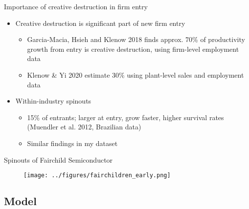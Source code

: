 \documentclass[english,usenames,dvipsnames,handout]{beamer}
\begin{document}
\begin{frame}{Importance of creative destruction in firm entry}\label{motivation:importance_of_creative_destruction}
	\hyperlink{motivation_spillovers}{}
	\begin{itemize}
		\item Creative destruction is significant part of new firm entry
		\begin{itemize}
			\item Garcia-Macia, Hsieh and Klenow 2018 finds approx. 70\% of productivity growth from entry is creative destruction, using firm-level employment data
			\item Klenow \& Yi 2020 estimate 30\% using plant-level sales and employment data
		\end{itemize}
	\end{itemize}
\end{frame}



\begin{frame}\label{spinouts_facts_from_literature}
\hyperlink{motivation_spillovers}{}
	\begin{itemize}
	\item Within-industry spinouts
		\begin{itemize}
		\item 15\% of entrants; larger at entry, grow faster, higher survival rates (Muendler et al. 2012, Brazilian data)
		\item Similar findings in my dataset
		\end{itemize}
	\end{itemize}
\end{frame}



\begin{frame}{Spinouts of Fairchild Semiconductor}\label{fairchildren_early}
\hyperlink{motivation_spillovers}{}
\begin{figure}
	\texttt{[image: ../figures/fairchildren\_early.png]}
\end{figure}
\end{frame}

\subsection{Model}
\end{document}
